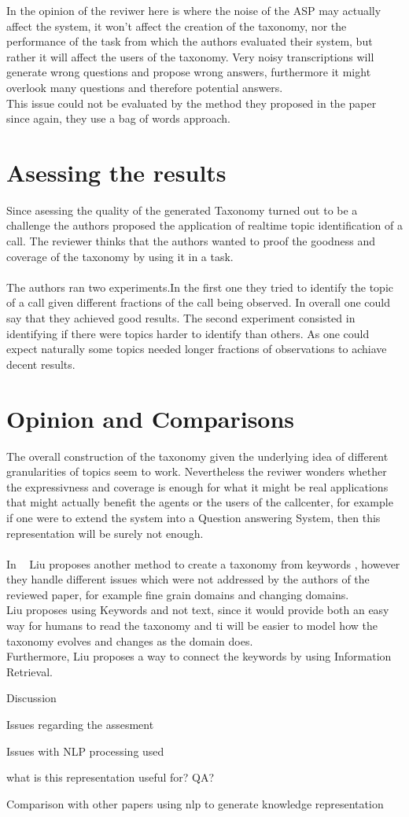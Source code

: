 \documentclass[4pt,a4paper]{article}
\begin{document}
In the opinion of the reviwer here is where the noise of the ASP may actually affect the system, it won't affect the creation of the taxonomy, nor the performance of the task from which the authors evaluated their system, but rather it will affect the users of the taxonomy. Very noisy transcriptions will generate wrong questions and propose wrong answers, furthermore it might overlook many questions and therefore potential answers.\\
This issue could not be evaluated by the method they proposed in the paper since again, they use a bag of words approach.


\section{Asessing the results}
Since asessing the quality of the generated Taxonomy turned out to be a challenge the
authors proposed the application of realtime topic identification of a call.
The reviewer thinks that the authors wanted to proof the goodness and coverage of the 
taxonomy by using it in a task.\\
\\
The authors ran two experiments.In the first one they tried to identify the topic of a call
given different fractions of the call being observed. In overall one could say that they achieved
good results.
The second experiment consisted in identifying if there were topics harder to identify than others.
As one could expect naturally some topics needed longer fractions of observations to achiave decent results.

\section{Opinion and Comparisons}


The overall construction of the taxonomy given the underlying idea of different granularities of topics seem to work. Nevertheless the reviwer wonders whether the expressivness and coverage is enough for what it might be real applications that might actually benefit the agents or the users of the callcenter, for example if one were to extend the system into a Question answering System, then this representation will be surely not enough.\\
\\
In ~\cite{DBLP:conf/kdd/LiuSLW12} Liu proposes another method to create a taxonomy from keywords , however they handle different issues which were not addressed by the authors of the reviewed paper, for example fine grain domains and changing domains.\\
Liu proposes using Keywords and not text, since it would provide both an easy way for humans to read the taxonomy and ti will be easier to model how the taxonomy evolves and changes as the domain does.\\
Furthermore, Liu proposes a way to connect the keywords by using Information Retrieval.

Discussion

Issues regarding the assesment

Issues with NLP processing used

what is this representation useful for? QA?

Comparison with other papers using nlp to generate knowledge representation







{}

\end{document}
